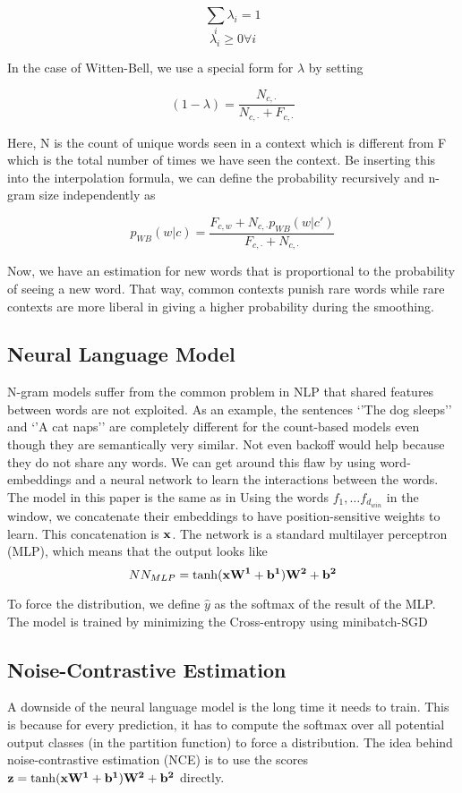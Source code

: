 \documentclass[11pt]{article}
\begin{document}
$$\sum_i\lambda_i=1$$
$$\lambda_i \geq 0 \forall i$$

In the case of Witten-Bell, we use a special form for $\lambda$ by setting 

$$(1-\lambda) = \frac{N_{c,\cdot}}{N_{c, \cdot}+F_{c,\cdot}}$$

Here, N is the count of unique words seen in a context which is different from F which is the total number of times we have seen the context. 
Be inserting this into the interpolation formula, we can define the probability recursively and n-gram size independently as

$$p_{WB}(w|c)=\frac{F_{c,w} + N_{c, \cdot}p_{WB}(w|c')}{F_{c,\cdot}+N_{c,\cdot}}$$

Now, we have an estimation for new words that is proportional to the probability of seeing a new word. That way, common contexts punish rare words while rare contexts are more liberal in giving a higher probability during the smoothing.

\subsection{Neural Language Model}

N-gram models suffer from the common problem in NLP that shared features between words are not exploited. As an example, the sentences `'The dog sleeps'' and `'A cat naps'' are completely different for the count-based models even though they are semantically very similar. Not even backoff would help because they do not share any words. 
We can get around this flaw by using word-embeddings and a neural network to learn the interactions between the words. The model in this paper is the same as in \citet{Bengio2003neural}
Using the words $f_1, \ldots f_{d_{win}}$ in the window, we concatenate their embeddings to have position-sensitive weights to learn. This concatenation is $\bf{x}$. 
The network is a standard multilayer perceptron (MLP), which means that the output looks like 
$$ NN_{MLP}=\tanh(\bf{xW}^1+\bf{b}^1)\bf{W}^2+\bf{b}^2$$

To force the distribution, we define $\hat{y}$ as the softmax of the result of the MLP. 
The model is trained by minimizing the Cross-entropy using minibatch-SGD

\subsection{Noise-Contrastive Estimation}

A downside of the neural language model is the long time it needs to train. This is because for every prediction, it has to compute the softmax over all potential output classes (in the partition function) to force a distribution. 
The idea behind noise-contrastive estimation (NCE) is to use the scores $\bf z = \tanh(\bf x\bf W^1 + \bf b^1)\bf W^2 + \bf b^2$ directly.~\citep{gutmann2010noise}
\end{document}
